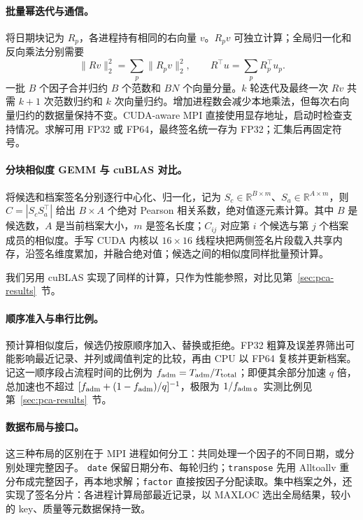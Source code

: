 \documentclass[11pt,a4paper,UTF8,fontset=fandol]{ctexart}
\newcommand{\code}[1]{\texttt{#1}}
\begin{document}
\paragraph{批量幂迭代与通信。}
将日期块记为 $R_p$，各进程持有相同的右向量 $v$。$R_pv$ 可独立计算；全局归一化和反向乘法分别需要
\begin{equation}
  \|Rv\|_2^2=\sum_p\|R_pv\|_2^2,
  \qquad R^\top u=\sum_p R_p^\top u_p .
  \label{eq:pca-reduce}
\end{equation}
一批 $B$ 个因子合并归约 $B$ 个范数和 $BN$ 个向量分量。$k$ 轮迭代及最终一次 $Rv$ 共需 $k+1$ 次范数归约和 $k$ 次向量归约。增加进程数会减少本地乘法，但每次右向量归约的数据量保持不变。CUDA-aware MPI 直接使用显存地址，启动时检查支持情况。求解可用 FP32 或 FP64，最终签名统一存为 FP32；汇集后再固定符号。

\paragraph{分块相似度 GEMM 与 cuBLAS 对比。}
将候选和档案签名分别逐行中心化、归一化，记为 $S_c\in\mathbb{R}^{B\times m}$、$S_a\in\mathbb{R}^{A\times m}$，则 $C=|S_cS_a^\top|$ 给出 $B\times A$ 个绝对 Pearson 相关系数，绝对值逐元素计算。其中 $B$ 是候选数，$A$ 是当前档案大小，$m$ 是签名长度；$C_{ij}$ 对应第 $i$ 个候选与第 $j$ 个档案成员的相似度。手写 CUDA 内核以 $16\times16$ 线程块把两侧签名片段载入共享内存，沿签名维度累加，并融合绝对值；候选之间的相似度同样批量预计算。

我们另用 cuBLAS 实现了同样的计算，只作为性能参照，对比见第~\ref{sec:pca-results}~节。

\paragraph{顺序准入与串行比例。}
预计算相似度后，候选仍按原顺序加入、替换或拒绝。FP32 粗算及误差界筛出可能影响最近记录、并列或阈值判定的比较，再由 CPU 以 FP64 复核并更新档案。记这一顺序段占流程时间的比例为 $f_{\rm adm}=T_{\rm adm}/T_{\rm total}$；即便其余部分加速 $q$ 倍，总加速也不超过 $[f_{\rm adm}+(1-f_{\rm adm})/q]^{-1}$，极限为 $1/f_{\rm adm}$。实测比例见第~\ref{sec:pca-results}~节。

\paragraph{数据布局与接口。}这三种布局的区别在于 MPI 进程如何分工：共同处理一个因子的不同日期，或分别处理完整因子。
\code{date} 保留日期分布、每轮归约；\code{transpose} 先用 Alltoallv 重分布成完整因子，再本地求解；\code{factor} 直接按因子分配读取。集中档案之外，还实现了签名分片：各进程计算局部最近记录，以 MAXLOC 选出全局结果，较小的 key、质量等元数据保持一致。
\end{document}
